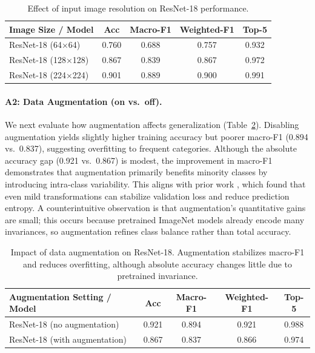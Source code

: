 \documentclass[11pt]{article}
\begin{document}
\begin{table}[H]
  \centering
  \begin{tabular}{lcccc}
    \toprule
    \textbf{Image Size / Model} & \textbf{Acc} & \textbf{Macro-F1} & \textbf{Weighted-F1} & \textbf{Top-5} \\
    \midrule
    ResNet-18 (64×64)  & 0.760 & 0.688 & 0.757 & 0.932 \\
    ResNet-18 (128×128) & 0.867 & 0.839 & 0.867 & 0.972 \\
    ResNet-18 (224×224) & 0.901 & 0.889 & 0.900 & 0.991 \\
    \bottomrule
  \end{tabular}
  \caption{Effect of input image resolution on ResNet-18 performance.}
  \label{tab:abl_image_size}
\end{table}

\paragraph{A2: Data Augmentation (on vs.\ off).}
We next evaluate how augmentation affects generalization (Table~\ref{tab:abl_augmentation}).
Disabling augmentation yields slightly higher training accuracy but poorer macro-F1 (0.894 vs.\ 0.837),
suggesting overfitting to frequent categories.
Although the absolute accuracy gap (0.921 vs.\ 0.867) is modest, the improvement in macro-F1
demonstrates that augmentation primarily benefits minority classes by introducing intra-class variability.
This aligns with prior work \cite{Szegedy2016}, which found that even mild transformations
can stabilize validation loss and reduce prediction entropy.
A counterintuitive observation is that augmentation’s quantitative gains are small;
this occurs because pretrained ImageNet models already encode many invariances,
so augmentation refines class balance rather than total accuracy.

\begin{table}[H]
  \centering
  \begin{tabular}{lcccc}
    \toprule
    \textbf{Augmentation Setting / Model} & \textbf{Acc} & \textbf{Macro-F1} & \textbf{Weighted-F1} & \textbf{Top-5} \\
    \midrule
    ResNet-18 (no augmentation) & 0.921 & 0.894 & 0.921 & 0.988 \\
    ResNet-18 (with augmentation) & 0.867 & 0.837 & 0.866 & 0.974 \\
    \bottomrule
  \end{tabular}
  \caption{Impact of data augmentation on ResNet-18. Augmentation stabilizes macro-F1 and reduces overfitting, although absolute accuracy changes little due to pretrained invariance.}
  \label{tab:abl_augmentation}
\end{table}
\end{document}
